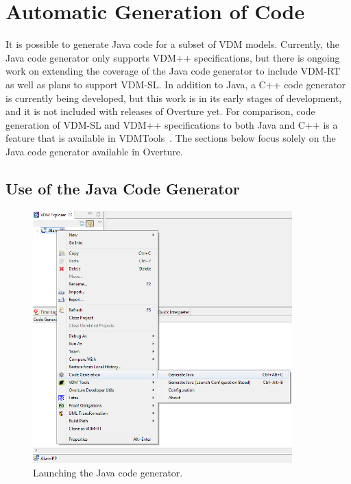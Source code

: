 
\chapter{Automatic Generation of Code}\label{sec:codegen}

It is possible to generate Java code for a
subset of VDM models. Currently, the Java code generator only supports
VDM++ specifications, but there is ongoing work on extending the
coverage of the Java code generator to include VDM-RT as well as plans
to support VDM-SL. In addition to Java, a C++ code generator is
currently being developed, but this work is in its early stages of
development, and it is not included with releases of Overture yet. For
comparison, code generation of VDM-SL and VDM++ specifications to both
Java and C++ is a feature that is available in
VDMTools~\cite{Java2VDMMan,CGMan,CGManPP}. The sections below focus
solely on the Java code generator available in Overture.

\section{Use of the Java Code Generator}
\label{sec:javacg_use}

\begin{figure}[htbp]
\begin{center}
\includegraphics[width=10cm]{screenDumps/javacg_menu}
\caption{Launching the Java code generator.\label{fig:javacg_menu}}
\end{center}
\end{figure}

